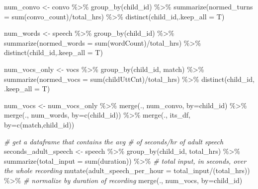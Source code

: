 \documentclass[
]{article}
\newenvironment{Shaded}{\begin{snugshade}}{\end{snugshade}}
\newcommand{\AttributeTok}[1]{\textcolor[rgb]{0.77,0.63,0.00}{#1}}
\newcommand{\CommentTok}[1]{\textcolor[rgb]{0.56,0.35,0.01}{\textit{#1}}}
\newcommand{\FunctionTok}[1]{\textcolor[rgb]{0.00,0.00,0.00}{#1}}
\newcommand{\NormalTok}[1]{#1}
\newcommand{\OtherTok}[1]{\textcolor[rgb]{0.56,0.35,0.01}{#1}}
\newcommand{\SpecialCharTok}[1]{\textcolor[rgb]{0.00,0.00,0.00}{#1}}
\newcommand{\StringTok}[1]{\textcolor[rgb]{0.31,0.60,0.02}{#1}}
\begin{document}
\begin{Shaded}
\begin{Highlighting}[]
\NormalTok{num\_convo }\OtherTok{\textless{}{-}}\NormalTok{ convo }\SpecialCharTok{\%\textgreater{}\%}
  \FunctionTok{group\_by}\NormalTok{(child\_id) }\SpecialCharTok{\%\textgreater{}\%}
  \FunctionTok{summarize}\NormalTok{(}\AttributeTok{normed\_turns =} \FunctionTok{sum}\NormalTok{(convo\_count)}\SpecialCharTok{/}\NormalTok{total\_hrs) }\SpecialCharTok{\%\textgreater{}\%}
  \FunctionTok{distinct}\NormalTok{(child\_id,}\AttributeTok{.keep\_all =}\NormalTok{ T)}

\NormalTok{num\_words }\OtherTok{\textless{}{-}}\NormalTok{ speech }\SpecialCharTok{\%\textgreater{}\%}
  \FunctionTok{group\_by}\NormalTok{(child\_id) }\SpecialCharTok{\%\textgreater{}\%}
  \FunctionTok{summarize}\NormalTok{(}\AttributeTok{normed\_words =} \FunctionTok{sum}\NormalTok{(wordCount)}\SpecialCharTok{/}\NormalTok{total\_hrs) }\SpecialCharTok{\%\textgreater{}\%}
  \FunctionTok{distinct}\NormalTok{(child\_id,}\AttributeTok{.keep\_all =}\NormalTok{ T)}

\NormalTok{num\_vocs\_only }\OtherTok{\textless{}{-}}\NormalTok{ vocs }\SpecialCharTok{\%\textgreater{}\%}
  \FunctionTok{group\_by}\NormalTok{(child\_id, match) }\SpecialCharTok{\%\textgreater{}\%}
  \FunctionTok{summarize}\NormalTok{(}\AttributeTok{normed\_vocs =} \FunctionTok{sum}\NormalTok{(childUttCnt)}\SpecialCharTok{/}\NormalTok{total\_hrs) }\SpecialCharTok{\%\textgreater{}\%}
  \FunctionTok{distinct}\NormalTok{(child\_id, }\AttributeTok{.keep\_all =}\NormalTok{ T) }

\NormalTok{num\_vocs }\OtherTok{\textless{}{-}}\NormalTok{ num\_vocs\_only }\SpecialCharTok{\%\textgreater{}\%}
  \FunctionTok{merge}\NormalTok{(., num\_convo, }\AttributeTok{by=}\StringTok{\textquotesingle{}child\_id\textquotesingle{}}\NormalTok{) }\SpecialCharTok{\%\textgreater{}\%}
  \FunctionTok{merge}\NormalTok{(., num\_words, }\AttributeTok{by=}\FunctionTok{c}\NormalTok{(}\StringTok{\textquotesingle{}child\_id\textquotesingle{}}\NormalTok{)) }\SpecialCharTok{\%\textgreater{}\%}
  \FunctionTok{merge}\NormalTok{(., its\_df, }\AttributeTok{by=}\FunctionTok{c}\NormalTok{(}\StringTok{\textquotesingle{}match\textquotesingle{}}\NormalTok{,}\StringTok{\textquotesingle{}child\_id\textquotesingle{}}\NormalTok{))}

\CommentTok{\# get a dataframe that contains the avg \# of seconds/hr of adult speech}
\NormalTok{seconds\_adult\_speech }\OtherTok{\textless{}{-}}\NormalTok{ speech }\SpecialCharTok{\%\textgreater{}\%}
  \FunctionTok{group\_by}\NormalTok{(child\_id, total\_hrs) }\SpecialCharTok{\%\textgreater{}\%}
  \FunctionTok{summarize}\NormalTok{(}\AttributeTok{total\_input =} \FunctionTok{sum}\NormalTok{(duration)) }\SpecialCharTok{\%\textgreater{}\%} \CommentTok{\# total input, in seconds, over the whole recording }
  \FunctionTok{mutate}\NormalTok{(}\AttributeTok{adult\_speech\_per\_hour =}\NormalTok{ total\_input}\SpecialCharTok{/}\NormalTok{(total\_hrs)) }\SpecialCharTok{\%\textgreater{}\%} \CommentTok{\# normalize by duration of recording }
  \FunctionTok{merge}\NormalTok{(., num\_vocs, }\AttributeTok{by=}\StringTok{\textquotesingle{}child\_id\textquotesingle{}}\NormalTok{)}


\end{Highlighting}
\end{Shaded}
\end{document}
